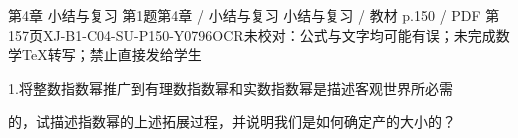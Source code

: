 \begin{bankitem}{第4章 小结与复习 第1题}{第4章 / 小结与复习 小结与复习 / 教材 p.150 / PDF 第157页}{XJ-B1-C04-SU-P150-Y0796}{OCR未校对：公式与文字均可能有误；未完成数学TeX转写；禁止直接发给学生}
\begin{ocrdraft}
\par
1.将整数指数幂推广到有理数指数幂和实数指数幂是描述客观世界所必需
\par
的，试描述指数幂的上述拓展过程，并说明我们是如何确定产的大小的？
\end{ocrdraft}
\end{bankitem}

